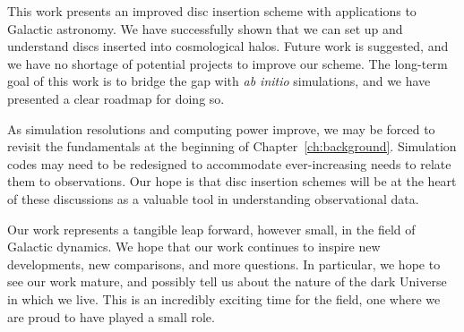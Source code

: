 
This work presents an improved disc insertion scheme with applications to Galactic astronomy. We have successfully shown that we can set up and understand discs inserted into cosmological halos. Future work is suggested, and we have no shortage of potential projects to improve our scheme. The long-term goal of this work is to bridge the gap with \textit{ab initio} simulations, and we have presented a clear roadmap for doing so.

As simulation resolutions and computing power improve, we may be forced to revisit the fundamentals at the beginning of Chapter~\ref{ch:background}. Simulation codes may need to be redesigned to accommodate ever-increasing needs to relate them to observations. Our hope is that disc insertion schemes will be at the heart of these discussions as a valuable tool in understanding observational data.

Our work represents a tangible leap forward, however small, in the field of Galactic dynamics.  We hope that our work continues to inspire new developments, new comparisons, and more questions. In particular, we hope to see our work mature, and possibly tell us about the nature of the dark Universe in which we live. This is an incredibly exciting time for the field, one where we are proud to have played a small role.




